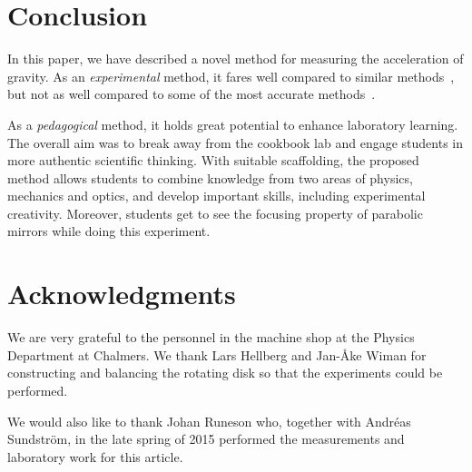 \documentclass[12pt, a4paper, twocolumn]{article}
\begin{document}
\section{Conclusion}

In this paper, we have described a novel method for measuring the acceleration of gravity. As an \emph{experimental} method, it fares well compared to similar methods~\cite{IPhO2001}, but not as well compared to some of the most accurate methods~\cite{Candela2001}. 

As a \emph{pedagogical} method, it holds great potential to enhance laboratory learning. The overall aim was to break away from the cookbook lab and engage students in more authentic scientific thinking. With suitable scaffolding, the proposed method allows students to combine knowledge from two areas of physics, mechanics and optics, and develop important skills, including experimental creativity. Moreover, students get to see the focusing property of parabolic mirrors while doing this experiment.

\section*{Acknowledgments}

We are very grateful to the personnel in the machine shop at the
Physics Department at Chalmers. We thank Lars Hellberg and Jan-Åke
Wiman for constructing and balancing the rotating disk so that the
experiments could be performed. 

We would also like to thank Johan Runeson who, together with Andréas
Sundström, in the late spring of 2015 performed the measurements and
laboratory work for this article. 



\end{document}
